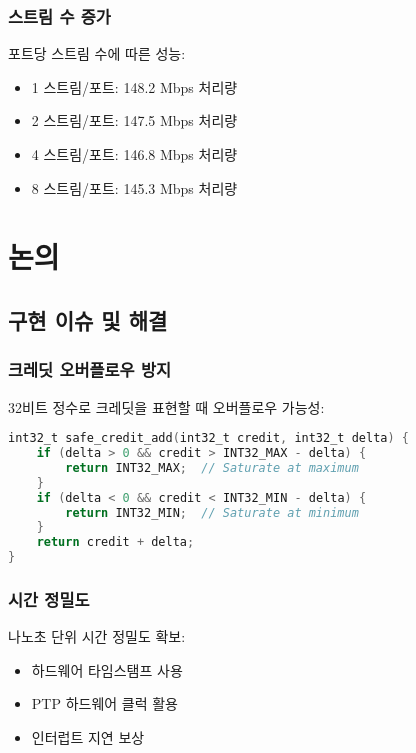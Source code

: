 \documentclass[twocolumn,10pt]{article}
\begin{document}
\subsubsection{스트림 수 증가}

포트당 스트림 수에 따른 성능:

\begin{itemize}
    \item 1 스트림/포트: 148.2 Mbps 처리량
    \item 2 스트림/포트: 147.5 Mbps 처리량
    \item 4 스트림/포트: 146.8 Mbps 처리량
    \item 8 스트림/포트: 145.3 Mbps 처리량
\end{itemize}

\section{논의}
\label{sec:discussion}

\subsection{구현 이슈 및 해결}

\subsubsection{크레딧 오버플로우 방지}

32비트 정수로 크레딧을 표현할 때 오버플로우 가능성:

\begin{lstlisting}[language=C, caption=오버플로우 방지 구현]
int32_t safe_credit_add(int32_t credit, int32_t delta) {
    if (delta > 0 && credit > INT32_MAX - delta) {
        return INT32_MAX;  // Saturate at maximum
    }
    if (delta < 0 && credit < INT32_MIN - delta) {
        return INT32_MIN;  // Saturate at minimum
    }
    return credit + delta;
}
\end{lstlisting}

\subsubsection{시간 정밀도}

나노초 단위 시간 정밀도 확보:

\begin{itemize}
    \item 하드웨어 타임스탬프 사용
    \item PTP 하드웨어 클럭 활용
    \item 인터럽트 지연 보상
\end{itemize}
\end{document}
